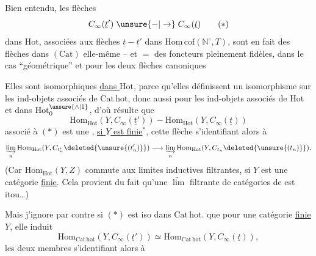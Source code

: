 Bien entendu, les flèches
\[
C_\infty(\underline t')\mathrel{\unsure{-|\to}}C_\infty(\underline t)
\tag*{$(*)$}
\]
dans $\mathrm{Hot}$, associées aux flèches $\underline t\mathrel{-}\underline t'$ dans $\underline{\mathrm{Hom\,cof}}(\mathbb N^\circ,T)$, sont en fait des flèches dans $(\mathrm{Cat})$ elle-même -- et $=$ des foncteurs pleinement fidèles, dans le cas ``géométrique'' et pour les deux flèches canoniques

Elles sont isomorphiques \uline{dans $\mathrm{Hot}$}, parce qu'elles  définissent un isomorphisme sur les ind-objets associés de $\mathrm{Cat\,hot}$, donc aussi pour les ind-objets associés de $\mathrm{Hot}$ et  dans $\mathrm{Hot}_0^{\unsure{\wedge|1}}$, d'où résulte que
\[
\mathrm{Hom}_{\mathrm{Hot}}(Y,C_\infty(\underline t'))\mathrel{-}
\mathrm{Hom}_{\mathrm{Hot}}(Y,C_\infty(\underline t))
\]
associé à $(*)$ est une  , \uline{si $Y$ est finie}$^{*}$, cette flèche s'identifiant alors à
\[
\underset{n}{\underrightarrow{\lim}}\,\mathrm{Hom}_{\mathrm{Hot}}(Y,C_{t'_n}\deleted{\unsure{(t'_n)}})
\longrightarrow\underset{n}{\underrightarrow{\lim}}\,\mathrm{Hom}_{\mathrm{Hot}}(Y,C_{t_n}\deleted{\unsure{(t_n)}}).
\]
(Car $\mathrm{Hom}_{\mathrm{Hot}}(Y,Z)$ commute aux limites inductives filtrantes, si $Y$ est une catégorie \uline{finie}. \deleted{\unsure{)}} Cela provient du fait qu'une $\underrightarrow{\lim}$ filtrante de catégories de  est itou\ldots)

Mais j'ignore par contre si $(*)$ est iso dans $\mathrm{Cat\,hot}$.  que pour une catégorie \uline{finie} $Y$, elle induit
\[
\mathrm{Hom}_{\mathrm{Cat\,hot}}(Y,C_\infty(\underline t'))\simeq
\mathrm{Hom}_{\mathrm{Cat\,hot}}(Y,C_\infty(\underline t)),
\]
les deux membres s'identifiant alors à
